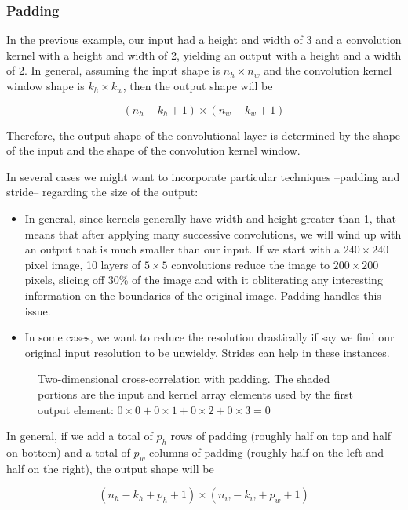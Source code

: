 \subsubsection{Padding}

In the previous example, our input had a height and width of 3 and a convolution kernel with a height and width of 2, yielding an output with a height and a width of 2. In general, assuming the input shape is  $n_h \times n_w$  and the convolution kernel window shape is $k_h \times k_w$, then the output shape will be

$$(n_h-k_h+1) \times (n_w-k_w+1)$$
 
Therefore, the output shape of the convolutional layer is determined by the shape of the input and the shape of the convolution kernel window.

In several cases we might want to incorporate particular techniques --padding and stride-- regarding the size of the output:
\begin{itemize}
    \item In general, since kernels generally have width and height greater than 1, that means that after applying many successive convolutions, we will wind up with an output that is much smaller than our input. If we start with a $240\times240$ pixel image, 10 layers of $5\times5$ convolutions reduce the image to $200\times200$ pixels, slicing off 30\% of the image and with it obliterating any interesting information on the boundaries of the original image. Padding handles this issue.
    \item In some cases, we want to reduce the resolution drastically if say we find our original input resolution to be unwieldy. Strides can help in these instances.
\end{itemize}

\begin{figure}[hpt]
	\centering
	
	\caption{Two-dimensional cross-correlation with padding. The shaded portions are the input and kernel array elements used by the first output element: $0\times0+0\times1+0\times2+0\times3=0$}
	\label{fig:conv_pad}
\end{figure}

In general, if we add a total of  $p_h$  rows of padding (roughly half on top and half on bottom) and a total of  $p_w$  columns of padding (roughly half on the left and half on the right), the output shape will be

$$(n_h-k_h+p_h+1)\times(n_w-k_w+p_w+1)$$
 
